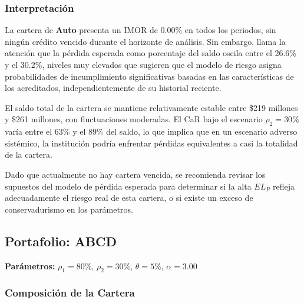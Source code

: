 \subsubsection{Interpretación}

La cartera de \textbf{Auto} presenta un IMOR de 0.00\% en todos los periodos, sin ningún crédito vencido durante el horizonte de análisis. Sin embargo, llama la atención que la pérdida esperada como porcentaje del saldo oscila entre el 26.6\% y el 30.2\%, niveles muy elevados que sugieren que el modelo de riesgo asigna probabilidades de incumplimiento significativas basadas en las características de los acreditados, independientemente de su historial reciente.

El saldo total de la cartera se mantiene relativamente estable entre \$219 millones y \$261 millones, con fluctuaciones moderadas. El CaR bajo el escenario $\rho_2 = 30\%$ varía entre el 63\% y el 89\% del saldo, lo que implica que en un escenario adverso sistémico, la institución podría enfrentar pérdidas equivalentes a casi la totalidad de la cartera.

Dado que actualmente no hay cartera vencida, se recomienda revisar los supuestos del modelo de pérdida esperada para determinar si la alta $EL_P$ refleja adecuadamente el riesgo real de esta cartera, o si existe un exceso de conservadurismo en los parámetros.

\newpage

\subsection{Portafolio: ABCD}

\textbf{Parámetros:} $\rho_1 = 80\%$, $\rho_2 = 30\%$, $\theta = 5\%$, $\alpha = 3.00$

\subsubsection{Composición de la Cartera}

